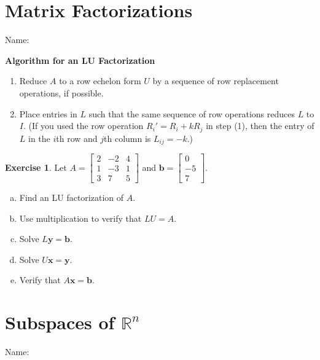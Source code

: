 \documentclass[10pt]{book}
\newcommand{\boxcolor}{gray!30}
\newenvironment{boxthm}{\begin{mdframed}[backgroundcolor=\boxcolor,nobreak=true]}{\end{mdframed}}
\theoremstyle{definition}
\newtheorem{exercise}{Exercise}[section]
\newcommand{\name}[1][2.5in]{\vspace{-2.3em}\hfill Name: \underline{\hspace{#1}}}
\newcommand{\vect}[1]{\ensuremath{\boldsymbol{\mathbf{#1}}}}
\begin{document}
\newpage

\setcounter{section}{4}


\section{Matrix Factorizations}
\name[1.5in]

\begin{boxthm}
	\textbf{Algorithm for an LU Factorization}
		\begin{enumerate}[(1)]
		\item Reduce $A$ to a row echelon form $U$ by a sequence of row replacement operations, if possible. 
		\item Place entries in $L$ such that the same sequence of row operations reduces $L$ to $I$. (If you used the row operation $R_i'=R_i+kR_j$ in step (1), then the entry of $L$ in the $i$th row and $j$th column is $L_{ij}=-k$.)
	\end{enumerate}
\end{boxthm}

\begin{exercise} %
	Let $A = \begin{bmatrix}2&-2&4\\1&-3&1\\3&7&5\end{bmatrix}$ and $\vect{b} = \begin{bmatrix}0\\-5\\7\end{bmatrix}$.
	\begin{enumerate}[(a)]
		\item Find an LU factorization of $A$.
		\vfill
		\vfill
		\item Use multiplication to verify that $LU=A$.
		\vfill
		\newpage
		\item Solve $L\vect{y}=\vect{b}$. 
		\vfill
		\item Solve $U\vect{x}=\vect{y}$. 
		\vfill
		\item Verify that $A\vect{x}=\vect{b}$.
		\vspace{4cm}
	\end{enumerate}
\end{exercise}
	
\newpage

\setcounter{section}{7}


\section{Subspaces of $\mathbb{R}^n$}
\name[1.5in]
\end{document}

